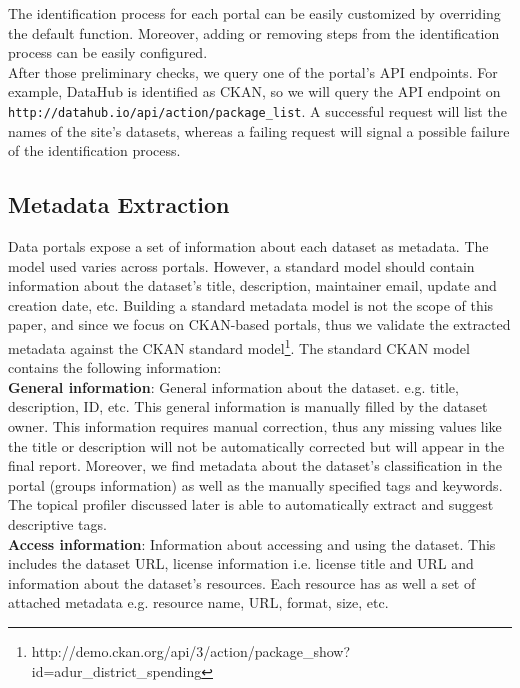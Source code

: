\documentclass[runningheads,a4paper]{llncs}
\begin{document}
The identification process for each portal can be easily customized by overriding the default function. Moreover, adding or removing steps from the identification process can be easily configured.\\
After those preliminary checks, we query one of the portal's API endpoints. For example, DataHub is identified as CKAN, so we will query the API endpoint on \texttt{http://datahub.io/api/action/package\_list}. A successful request will list the names of the site's datasets, whereas a failing request will signal a possible failure of the identification process.

\subsection{Metadata Extraction}

Data portals expose a set of information about each dataset as metadata. The model used varies across portals. However, a standard model should contain information about the dataset's title, description, maintainer email, update and creation date, etc. Building a standard metadata model is not the scope of this paper, and since we focus on CKAN-based portals, thus we validate the extracted metadata against the CKAN standard model\footnote{http://demo.ckan.org/api/3/action/package\_show?id=adur\_district\_spending}.  The standard CKAN model contains the following information:\\

\textbf{General information}: General information about the dataset. e.g. title, description, ID, etc. This general information is manually filled by the dataset owner. This information requires manual correction, thus any missing values like the title or description will not be automatically corrected but will appear in the final report. Moreover, we find metadata about the dataset's classification in the portal (groups information) as well as the manually specified tags and keywords. The topical profiler discussed later is able to automatically extract and suggest descriptive tags.\\

\textbf{Access information}: Information about accessing and using the dataset. This includes the dataset URL, license information i.e. license title and URL and information about the dataset's resources. Each resource has as well a set of attached metadata e.g. resource name, URL, format, size, etc.\\
\end{document}
